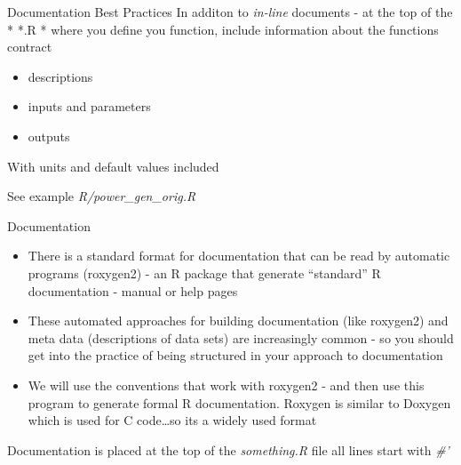 \documentclass[
  ignorenonframetext,
]{beamer}
\providecommand{\tightlist}{%
  \setlength{\itemsep}{0pt}\setlength{\parskip}{0pt}}
\begin{document}
\begin{frame}{Documentation Best Practices}
\protect\hypertarget{documentation-best-practices}{}
In additon to \emph{in-line} documents - at the top of the * *.R * where
you define you function, include information about the functions
contract

\begin{itemize}
\tightlist
\item
  descriptions
\item
  inputs and parameters
\item
  outputs
\end{itemize}

With units and default values included

See example \emph{R/power\_gen\_orig.R}
\end{frame}

\begin{frame}{{Documentation}}
\protect\hypertarget{documentation}{}
\begin{itemize}
\item
  There is a standard format for documentation that can be read by
  automatic programs (roxygen2) - an R package that generate
  ``standard'' R documentation - manual or help pages
\item
  These automated approaches for building documentation (like roxygen2)
  and meta data (descriptions of data sets) are increasingly common - so
  you should get into the practice of being structured in your approach
  to documentation
\item
  We will use the conventions that work with roxygen2 - and then use
  this program to generate formal R documentation. Roxygen is similar to
  Doxygen which is used for C code\ldots so its a widely used format
\end{itemize}

Documentation is placed at the top of the \emph{something.R} file all
lines start with \emph{\#'}
\end{frame}
\end{document}
